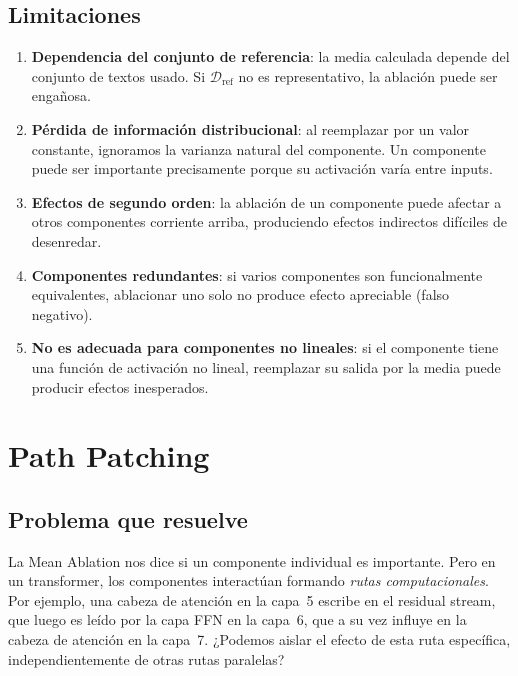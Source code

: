 \documentclass[11pt,a4paper]{report}
\theoremstyle{definition}
\begin{document}
\section{Limitaciones}

\begin{enumerate}
    \item \textbf{Dependencia del conjunto de referencia}: la media calculada depende del conjunto de textos usado. Si $\mathcal{D}_{\text{ref}}$ no es representativo, la ablación puede ser engañosa.
    \item \textbf{Pérdida de información distribucional}: al reemplazar por un valor constante, ignoramos la varianza natural del componente. Un componente puede ser importante precisamente porque su activación varía entre inputs.
    \item \textbf{Efectos de segundo orden}: la ablación de un componente puede afectar a otros componentes corriente arriba, produciendo efectos indirectos difíciles de desenredar.
    \item \textbf{Componentes redundantes}: si varios componentes son funcionalmente equivalentes, ablacionar uno solo no produce efecto apreciable (falso negativo).
    \item \textbf{No es adecuada para componentes no lineales}: si el componente tiene una función de activación no lineal, reemplazar su salida por la media puede producir efectos inesperados.
\end{enumerate}

\newpage

\chapter{Path Patching}
\label{ch:path-patching}

\section{Problema que resuelve}

La Mean Ablation nos dice si un componente individual es importante. Pero en un transformer, los componentes interactúan formando \emph{rutas computacionales}. Por ejemplo, una cabeza de atención en la capa~5 escribe en el residual stream, que luego es leído por la capa FFN en la capa~6, que a su vez influye en la cabeza de atención en la capa~7. ¿Podemos aislar el efecto de esta ruta específica, independientemente de otras rutas paralelas?
\end{document}
